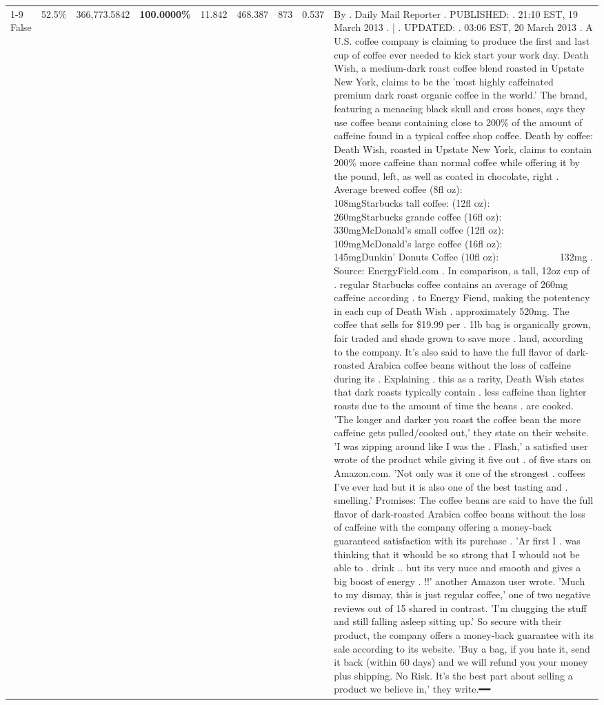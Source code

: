 \begin{table}[H]
{\begin{tabular}{lllrlllll}
\cline{1-9}
False & 52.5\% & 366,773.5842 & \bfseries \color{red} 100.0000\% & 11.842 & 468.387 & 873 & 0.537 & By . Daily Mail Reporter . PUBLISHED: . 21:10 EST, 19 March 2013 . | . UPDATED: . 03:06 EST, 20 March 2013 . A U.S. coffee company is claiming to produce the first and last cup of coffee ever needed to kick start your work day. Death Wish, a medium-dark roast coffee blend roasted in Upstate New York, claims to be the 'most highly caffeinated premium dark roast organic coffee in the world.' The brand, featuring a menacing black skull and cross bones, says they use coffee beans containing close to 200\% of the amount of caffeine found in a typical coffee shop coffee. Death by coffee: Death Wish, roasted in Upstate New York, claims to contain 200\% more caffeine than normal coffee while offering it by the pound, left, as well as coated in chocolate, right . Average brewed coffee (8fl oz):              108mgStarbucks tall coffee: (12fl oz):                260mgStarbucks grande coffee (16fl oz):         330mgMcDonald's small coffee (12fl oz):           109mgMcDonald's large coffee (16fl oz):           145mgDunkin' Donuts Coffee (10fl oz):             132mg . Source: EnergyField.com . In comparison, a tall, 12oz cup of . regular Starbucks coffee contains an average of 260mg caffeine according . to Energy Fiend, making the potentency in each cup of Death Wish . approximately 520mg. The coffee that sells for \$19.99 per . 1lb bag is organically grown, fair traded and shade grown to save more . land, according to the company. It's also said to have the full flavor of dark-roasted Arabica coffee beans without the loss of caffeine during its . Explaining . this as a rarity, Death Wish states that dark roasts typically contain . less caffeine than lighter roasts due to the amount of time the beans . are cooked. 'The longer and darker you roast the coffee bean the more caffeine gets pulled/cooked out,' they state on their website. 'I was zipping around like I was the . Flash,' a satisfied user wrote of the product while giving it five out . of five stars on Amazon.com. 'Not only was it one of the strongest . coffees I've ever had but it is also one of the best tasting and . smelling.’ Promises: The coffee beans are said to have the full flavor of dark-roasted Arabica coffee beans without the loss of caffeine with the company offering a money-back guaranteed satisfaction with its purchase . 'Ar first I . was thinking that it whould be so strong that I whould not be able to . drink .. but its very nuce and smooth and gives a big boost of energy . !!' another Amazon user wrote. 'Much to my dismay, this is just regular coffee,' one of two negative reviews out of 15 shared in contrast. 'I'm chugging the stuff and still falling asleep sitting up.' So secure with their product, the company offers a money-back guarantee with its sale according to its website. 'Buy a bag, if you hate it, send it back (within 60 days) and we will refund you your money plus shipping. No Risk. It’s the best part about selling a product we believe in,' they write.━━ \\

\end{tabular}}
\end{table}
